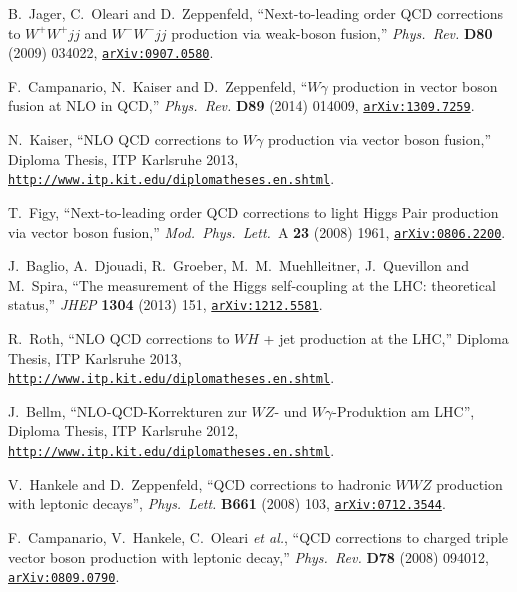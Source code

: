 \documentclass[english,12pt]{article}
\begin{document}
\begin{thebibliography}{10}
  B.~Jager, C.~Oleari and D.~Zeppenfeld,
  ``Next-to-leading order QCD corrections to $W^+ W^+ jj$ and $W^- W^- jj$ production via weak-boson fusion,''
  {\em Phys.\ Rev.} {\bf D80} (2009) 034022,
\href{http://arxiv.org/abs/0907.0580}{{\tt arXiv:0907.0580}}.

  F.~Campanario, N.~Kaiser and D.~Zeppenfeld,
  ``$W \gamma$ production in vector boson fusion at NLO in QCD,''
  {\em Phys.\ Rev.} {\bf D89} (2014) 014009,
\href{http://arxiv.org/abs/1309.7259}{{\tt arXiv:1309.7259}}.

N.~Kaiser, ``NLO QCD corrections to $W\gamma$ production via vector boson fusion,'' 
{Diploma Thesis, ITP Karlsruhe 2013}, 
\href{http://www.itp.kit.edu/diplomatheses.en.shtml}{{\tt http://www.itp.kit.edu/diplomatheses.en.shtml}}.
  
  T.~Figy,
  ``Next-to-leading order QCD corrections to light Higgs Pair production via vector boson fusion,''
  {\em Mod.\ Phys.\ Lett.}\ A {\bf 23} (2008) 1961,
\href{http://www.arXiv.org/abs/0806.2200}{{\tt arXiv:0806.2200}}.

  J.~Baglio, A.~Djouadi, R.~Groeber, M.~M.~Muehlleitner, J.~Quevillon and M.~Spira,
  ``The measurement of the Higgs self-coupling at the LHC: theoretical status,''
  {\em JHEP} {\bf 1304} (2013) 151,
\href{http://www.arXiv.org/abs/1212.5581}{{\tt arXiv:1212.5581}}.

R.~Roth, ``NLO QCD corrections to $WH$ + jet production at the LHC,'' 
{Diploma Thesis, ITP Karlsruhe 2013}, 
\href{http://www.itp.kit.edu/diplomatheses.en.shtml}{{\tt http://www.itp.kit.edu/diplomatheses.en.shtml}}.
  
 J.~Bellm, ``NLO-QCD-Korrekturen zur $WZ$- und $W\gamma$-Produktion am LHC'', {Diploma Thesis, ITP Karlsruhe 2012}, 
\href{http://www.itp.kit.edu/diplomatheses.en.shtml}{{\tt http://www.itp.kit.edu/diplomatheses.en.shtml}}.

V.~Hankele and D.~Zeppenfeld, ``{QCD corrections to hadronic $WWZ$ production
  with leptonic decays}'', {\em Phys.\ Lett.} {\bf B661} (2008) 103,
\href{http://www.arXiv.org/abs/0712.3544}{{\tt arXiv:0712.3544}}.

  F.~Campanario, V.~Hankele, C.~Oleari {\it et al.},
  ``QCD corrections to charged triple vector boson production with leptonic decay,''
  {\em Phys.\ Rev.}  {\bf D78} (2008) 094012,
  \href{http://arxiv.org/abs/0809.0790}{{\tt arXiv:0809.0790}}.


\end{thebibliography}
\end{document}

